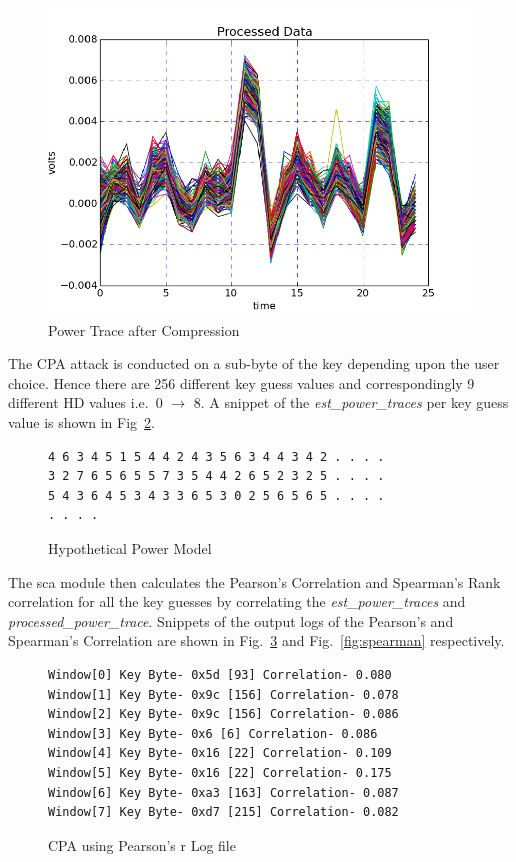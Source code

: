 \begin{figure}[H]
\begin{center}
\includegraphics[scale=0.8]{figures/scaTrace4}
\caption{\label{fig:ptcp}Power Trace after Compression}
\end{center} 
\vspace{-3ex}
\end{figure}

The CPA attack is conducted on a sub-byte of the key depending upon the user choice. Hence 
there are 256 different key guess values and correspondingly 9 different HD values i.e.\ 0 $\rightarrow$ 8.
A snippet of the \emph{est\_power\_traces} per key guess value is shown in Fig~\ref{fig:fobos-estpower}. 
\begin{figure}[ht]
\begin{verbatim}
4 6 3 4 5 1 5 4 4 2 4 3 5 6 3 4 4 3 4 2 . . . .
3 2 7 6 5 6 5 5 7 3 5 4 4 2 6 5 2 3 2 5 . . . .
5 4 3 6 4 5 3 4 3 3 6 5 3 0 2 5 6 5 6 5 . . . .
. . . .
\end{verbatim}
\caption{\label{fig:fobos-estpower}Hypothetical Power Model}
\end{figure}

The sca module then calculates the Pearson's Correlation and Spearman's Rank correlation
for all the key guesses by correlating 
the \emph{est\_power\_traces} and \emph{processed\_power\_trace}. 
Snippets of the output logs of the Pearson's and Spearman's Correlation are shown
in Fig.~\ref{fig:pearson} and Fig.~\ref{fig:spearman} respectively.

\begin{figure}[h]
\begin{verbatim}
Window[0] Key Byte- 0x5d [93] Correlation- 0.080
Window[1] Key Byte- 0x9c [156] Correlation- 0.078
Window[2] Key Byte- 0x9c [156] Correlation- 0.086
Window[3] Key Byte- 0x6 [6] Correlation- 0.086
Window[4] Key Byte- 0x16 [22] Correlation- 0.109
Window[5] Key Byte- 0x16 [22] Correlation- 0.175
Window[6] Key Byte- 0xa3 [163] Correlation- 0.087
Window[7] Key Byte- 0xd7 [215] Correlation- 0.082
\end{verbatim}
\caption{\label{fig:pearson}CPA using Pearson's r Log file}
\end{figure}

